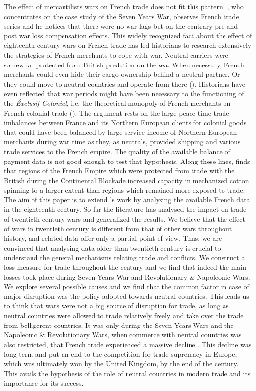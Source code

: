 \documentclass[12pt,a4paper,notitlepage,english]{article}
\begin{document}
The effect of mercantilists wars on French trade does not fit this pattern. \cite{riley_seven_1986}, who concentrates on the case study of the Seven Years War, observes French trade series and he notices that there were no war lags but on the contrary pre and post war loss compensation effects. This widely recognized fact about the effect of eighteenth century wars on French trade has led historians to research extensively the strategies of French merchants to cope with war. Neutral carriers were somewhat protected from British predation on the sea. When necessary, French merchants could even hide their cargo ownership behind a neutral partner. Or they could move to neutral countries and operate from there (\cite{marzagalli_was_2016}). Historians have even reflected that war periods might have been necessary to the functioning of the \textit{Éxclusif Colonial}, i.e. the theoretical monopoly of French merchants on French colonial trade (\cite{lespagnol_mondialisation_1997, morineau_vraie_1997, marzagalli_was_2016}). The argument rests on the large peace time trade imbalances between France and its Northern European clients for colonial goods that could have been balanced by large service income of Northern European merchants during war time as they, as neutrals, provided shipping and various trade services to the French empire. The quality of the available balance of payment data is not good enough to test that hypothesis. Along these lines, \cite{juhasz2014temporary} finds that regions of the French Empire which were protected from trade with the British during the Continental Blockade increased capacity in mechanized cotton spinning to a larger extent than regions which remained more exposed to trade. \\
The aim of this paper is to extend \cite{riley_seven_1986}’s work by analysing the available French data in the eighteenth century. So far the literature has analysed the impact on trade of twentieth century wars and generalized the results. We believe that the effect of wars in twentieth century is different from that of other wars throughout history, and related data offer only a partial point of view. Thus, we are convinced that analysing data older than twentieth century is crucial to understand the general mechanisms relating trade and conflicts. 
We construct a loss measure for trade throughout the century and we find that indeed the main losses took place during Seven Years War and Revolutionary \& Napoleonic Wars. We explore several possible causes and we find that the common factor in case of major disruption was the policy adopted towards neutral countries. This leads us to think that wars were not a big source of disruption for trade, as long as neutral countries were allowed to trade relatively freely and take over the trade from belligerent countries. It was only during the Seven Years Wars and the Napoleonic \& Revolutionary Wars, when commerce with neutral countries was also restricted, that French trade experienced a massive decline \citep{findlay2009power}. This decline was long-term and put an end to the competition for trade supremacy in Europe, which was ultimately won by the United Kingdom, by the end of the century. This avails the hypothesis of the role of neutral countries in modern trade and its importance for its success.
\end{document}
